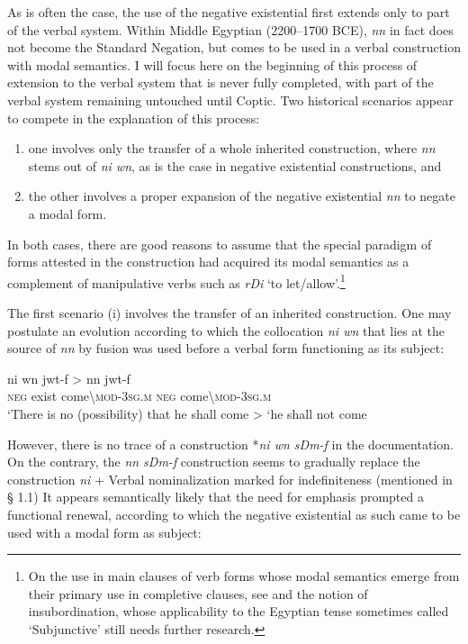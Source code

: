 \documentclass[output=paper]{langsci/langscibook}
\newcommand{\ꜥ}{ʿ}
\newcommand{\ꜣ}{\kern-.25pt\texttt{ꜣ}\kern-.6pt}
\begin{document}
As is often the case, the use of the negative existential first extends only to part of the verbal system. Within Middle Egyptian (2200–1700 BCE), \textit{nn} in fact does not become the Standard Negation, but comes to be used in a verbal construction with modal semantics. I will focus here on the beginning of this process of extension to the verbal system that is never fully completed, with part of the verbal system remaining untouched until Coptic. Two historical scenarios appear to compete in the explanation of this process: 
\begin{enumerate}
    \item one involves only the transfer of a whole inherited construction, where \textit{nn} stems out of \textit{ni wn}, as is the case in negative existential constructions, and
    \item the other involves a proper expansion of the negative existential \textit{nn} to negate a modal form.
\end{enumerate}
 
In both cases, there are good reasons to assume that the special paradigm of forms attested in the construction had acquired its modal semantics as a complement of manipulative verbs such as \textit{rDi} ‘to let/allow’.\footnote{On the use in main clauses of verb forms whose modal semantics emerge from their primary use in completive clauses, see \citet{Evans2007} and the notion of insubordination, whose applicability to the Egyptian tense sometimes called ‘Subjunctive’ still needs further research. }

The first scenario (i) involves the transfer of an inherited construction. One may postulate an evolution according to which the collocation \textit{ni wn} that lies at the source of \textit{nn} by fusion was used before a verbal form functioning as its subject:  

\ea \label{ex:AE35}
    \gll *ni wn jwt-f > nn jwt-f \\
    \textsc{neg} exist come\textbackslash\textsc{mod-3sg.m} { } \textsc{neg} come\textbackslash\textsc{mod-3sg.m}\\ 
    \glt ‘There is no (possibility) that he shall come > ‘he shall not come 
\z 

However, there is no trace of a construction *\textit{ni wn sDm-f} in the documentation. On the contrary, the \textit{nn sDm-f} construction seems to gradually replace the construction \textit{ni} + Verbal nominalization marked for indefiniteness (mentioned in § 1.1) It appears semantically likely that the need for emphasis prompted a functional renewal, according to which the negative existential as such came to be used with a modal form as subject: 
\end{document}
